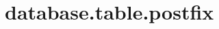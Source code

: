 \section{database.table.postfix}
\label{configuration:DatabaseTablePostfix}
\AvailableInJavaOnly{\TODO}